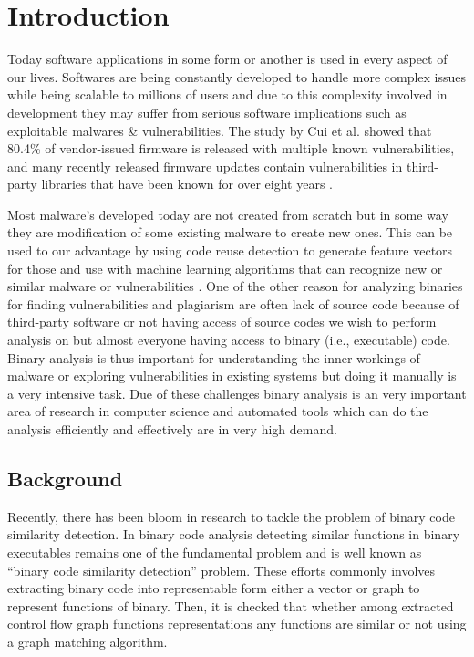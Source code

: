 \chapter{Introduction}
Today software applications in some form or another is used in every aspect of our lives. Softwares are being constantly developed to handle more complex issues while being scalable to millions of users and due to this complexity involved in development they may suffer from serious software implications such as exploitable malwares \& vulnerabilities. The study by Cui et al. showed that 80.4\% of vendor-issued firmware is released with multiple known vulnerabilities, and many recently released firmware updates contain vulnerabilities in third-party libraries that have been known for over eight years \cite{Cui}. 

Most malware's developed today are not created from scratch but in some way they are modification of some existing malware to create new ones. This can be used to our advantage by using code reuse detection to generate feature vectors for those and use with machine learning algorithms that can recognize new or similar malware or vulnerabilities \cite{Jang}. One of the other reason for analyzing binaries for finding vulnerabilities and plagiarism are often lack of source code because of third-party software \cite{Saeb} or not having access of source codes we wish to perform analysis on but almost everyone having access to binary (i.e., executable) code. Binary analysis is thus important for understanding the inner workings of malware or exploring vulnerabilities in existing systems but doing it manually is a very intensive task. Due of these challenges binary analysis is an very important area of research in computer science and automated tools which can do the analysis efficiently and effectively are in very high demand.

\section{Background}

Recently, there has been bloom in research to tackle the problem of binary code similarity detection. In binary code analysis detecting similar functions in binary executables remains one of the fundamental problem and is well known as ``binary code similarity detection'' problem. These efforts commonly involves extracting binary code into representable form either a vector or graph to represent functions of binary.  Then, it is checked that whether among extracted control flow graph functions representations any functions are similar or not using a graph matching algorithm.  

